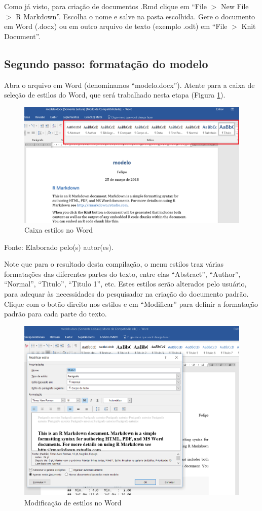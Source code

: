 \documentclass[12pt,brazil,]{book}
\begin{document}
Como já visto, para criação de documentos .Rmd clique em ``File \(>\)
New File \(>\) R Markdown''. Escolha o nome e salve na pasta escolhida.
Gere o documento em Word (.docx) ou em outro arquivo de texto (exemplo
.odt) em ``File \(>\) Knit Document''.

\hypertarget{segundo-passo-formatacao-do-modelo}{%
\subsection{Segundo passo: formatação do
modelo}\label{segundo-passo-formatacao-do-modelo}}

Abra o arquivo em Word (denominamos ``modelo.docx''). Atente para a
caixa de seleção de estilos do Word, que será trabalhado nesta etapa
(Figura \ref{fig:rmarkestilos}).

\begin{figure}

{\centering \includegraphics[width=0.6\linewidth]{rmarkestilos} 

}

\caption{Caixa estilos no Word}\label{fig:rmarkestilos}
\end{figure}

Fonte: Elaborado pelo(s) autor(es).

Note que para o resultado desta compilação, o menu estilos traz várias
formatações das diferentes partes do texto, entre elas ``Abstract'',
``Author'', ``Normal'', ``Titulo'', ``Titulo 1'', etc. Estes estilos
serão alterados pelo usuário, para adequar às necessidades do
pesquisador na criação do documento padrão. Clique com o botão direito
nos estilos e em ``Modificar'' para definir a formatação padrão para
cada parte do texto.

\begin{figure}

{\centering \includegraphics[width=0.6\linewidth]{rmarkestilos1} 

}

\caption{Modificação de estilos no Word}\label{fig:rmarkestilos1}
\end{figure}
\end{document}
